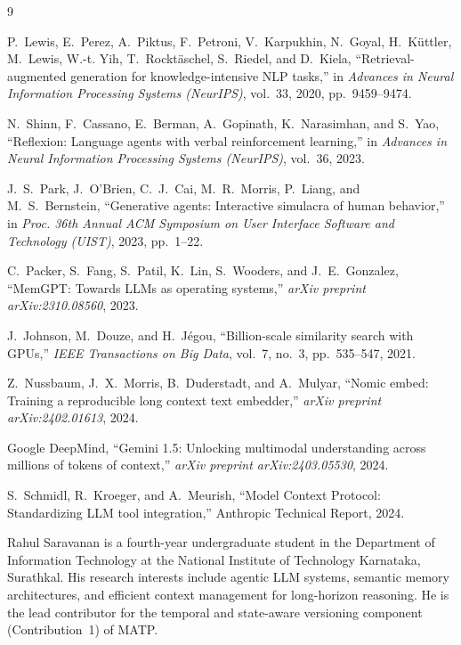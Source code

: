 \documentclass[lettersize,journal]{IEEEtran}
\begin{document}
\begin{thebibliography}{9}


P.~Lewis, E.~Perez, A.~Piktus, F.~Petroni, V.~Karpukhin, N.~Goyal, H.~K{\"u}ttler, M.~Lewis, W.-t. Yih, T.~Rockt{\"a}schel, S.~Riedel, and D.~Kiela, ``Retrieval-augmented generation for knowledge-intensive NLP tasks,'' in \textit{Advances in Neural Information Processing Systems (NeurIPS)}, vol.~33, 2020, pp.~9459--9474.

N.~Shinn, F.~Cassano, E.~Berman, A.~Gopinath, K.~Narasimhan, and S.~Yao, ``Reflexion: Language agents with verbal reinforcement learning,'' in \textit{Advances in Neural Information Processing Systems (NeurIPS)}, vol.~36, 2023.

J.~S.~Park, J.~O'Brien, C.~J.~Cai, M.~R.~Morris, P.~Liang, and M.~S.~Bernstein, ``Generative agents: Interactive simulacra of human behavior,'' in \textit{Proc. 36th Annual ACM Symposium on User Interface Software and Technology (UIST)}, 2023, pp.~1--22.

C.~Packer, S.~Fang, S.~Patil, K.~Lin, S.~Wooders, and J.~E.~Gonzalez, ``MemGPT: Towards LLMs as operating systems,'' \textit{arXiv preprint arXiv:2310.08560}, 2023.

J.~Johnson, M.~Douze, and H.~J{\'e}gou, ``Billion-scale similarity search with GPUs,'' \textit{IEEE Transactions on Big Data}, vol.~7, no.~3, pp.~535--547, 2021.

Z.~Nussbaum, J.~X.~Morris, B.~Duderstadt, and A.~Mulyar, ``Nomic embed: Training a reproducible long context text embedder,'' \textit{arXiv preprint arXiv:2402.01613}, 2024.

Google DeepMind, ``Gemini 1.5: Unlocking multimodal understanding across millions of tokens of context,'' \textit{arXiv preprint arXiv:2403.05530}, 2024.

S.~Schmidl, R.~Kroeger, and A.~Meurish, ``Model Context Protocol: Standardizing LLM tool integration,'' Anthropic Technical Report, 2024.

\end{thebibliography}

\newpage

\begin{IEEEbiographynophoto}{Rahul Saravanan}
is a fourth-year undergraduate student in the Department of Information Technology at the National Institute of Technology Karnataka, Surathkal. His research interests include agentic LLM systems, semantic memory architectures, and efficient context management for long-horizon reasoning. He is the lead contributor for the temporal and state-aware versioning component (Contribution~1) of MATP.
\end{IEEEbiographynophoto}
\end{document}
